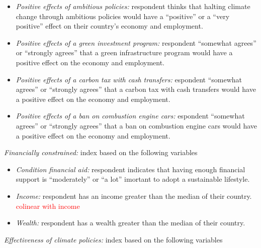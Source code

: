 \documentclass{article}
\begin{document}
\begin{itemize}
	\item \textit{Positive effects of ambitious policies:} respondent thinks that halting climate change through ambitious policies would have a ``positive'' or a ``very positive'' effect on their country's economy and employment.
	\item \textit{Positive effects of a green investment program:} respondent ``somewhat agrees'' or ``strongly agrees'' that a green infrastructure program would have a positive effect on the economy and employment.
	\item \textit{Positive effects of a carbon tax with cash transfers:} espondent ``somewhat agrees'' or ``strongly agrees'' that a carbon tax with cash transfers would have a positive effect on the economy and employment.
	\item \textit{Positive effects of a ban on combustion engine cars:} espondent ``somewhat agrees'' or ``strongly agrees'' that a ban on combustion engine cars would have a positive effect on the economy and employment.
\end{itemize}
\textit{Financially constrained:} index based on the following variables
\begin{itemize}
	\item \textit{Condition financial aid:} respondent indicates that having enough financial support is ``moderately'' or ``a lot'' imortant to adopt a sustainable lifestyle.
	\item \textit{Income:} respondent has an income greater than the median of their country.  \textcolor{red}{colinear with income}
	\item \textit{Wealth:} respondent has a wealth greater than the median of their country.
\end{itemize}
\textit{Effectiveness of climate policies:} index based on the following variables \\
\end{document}
